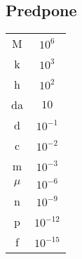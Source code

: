 {\color{indiagreen}\subsection{Predpone}}
\begin{center}
	\begin{tabular}{|c c|} 
 	\hline
 	M & $10^6$ \\
 	k & $10^3$ \\
 	h & $10^2$ \\
 	da & $10$ \\
 	d & $10^{-1}$ \\
 	c & $10^{-2}$ \\
 	m & $10^{-3}$ \\
 	$\mu$& $10^{-6}$ \\
 	n & $10^{-9}$ \\
 	p & $10^{-12}$ \\
 	f & $10^{-15}$ \\
 	\hline
 	\end{tabular}
\end{center}